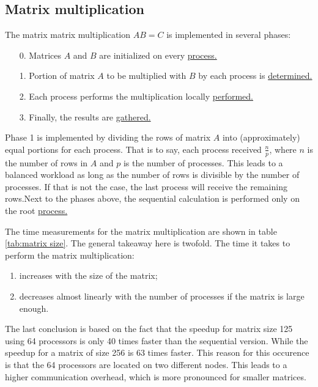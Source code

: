 \subsection{Matrix multiplication}
The matrix matrix multiplication $AB = C$ is implemented in several phases:
\begin{enumerate}
    \item [0.] Matrices $A$ and $B$ are initialized on every
    \href{https://github.com/PhilipSoliman/hpc-labs/blob/b16da8d7ee717657e13c316369fa0996da7816cc/intro/MM-product.c#L56-L68}{process.}
    \item [1.] Portion of matrix $A$ to be multiplied with $B$ by each process is 
    \href{https://github.com/PhilipSoliman/hpc-labs/blob/b16da8d7ee717657e13c316369fa0996da7816cc/intro/MM-product.c#L84-L92C7}{determined.}
    \item [2.] Each process performs the multiplication locally
    \href{https://github.com/PhilipSoliman/hpc-labs/blob/b16da8d7ee717657e13c316369fa0996da7816cc/intro/MM-product.c#L95-L110}{performed.}
    \item [3.] Finally, the results are
    \href{https://github.com/PhilipSoliman/hpc-labs/blob/b16da8d7ee717657e13c316369fa0996da7816cc/intro/MM-product.c#L95-L142}{gathered.}
\end{enumerate}
Phase 1 is implemented by dividing the rows of matrix $A$ into (approximately) equal portions for each process.
That is to say, each process received $\frac{n}{p}$, where $n$ is the number of rows in $A$ and $p$ is the number of processes.
This leads to a balanced workload as long as the number of rows is divisible by the number of processes.
If that is not the case, the last process will receive the remaining rows.Next to the phases above, the sequential calculation is performed only on the root 
\href{https://github.com/PhilipSoliman/hpc-labs/blob/b16da8d7ee717657e13c316369fa0996da7816cc/intro/MM-product.c#L71-L79}{process.}


The time measurements for the matrix multiplication are shown in table \ref{tab:matrix size}. 
The general takeaway here is twofold. The time it takes to perform the matrix multiplication:
\begin{enumerate}
    \item increases with the size of the matrix;
    \item decreases almost linearly with the number of processes if the matrix is large enough.
\end{enumerate}
The last conclusion is based on the fact that the speedup for matrix size 125 using 64 processors
is only 40 times faster than the sequential version. While the speedup for a matrix of size 256 is 63 times faster. 
This reason for this occurence is that the 64 processors are located on two different nodes. 
This leads to a higher communication overhead, which is more pronounced for smaller matrices.